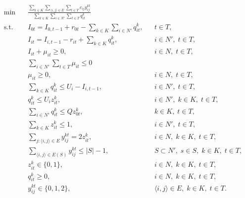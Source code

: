\documentclass{article}
\begin{document}
\begin{align}
    \min \quad & \frac{\displaystyle \sum_{k \in K} \sum_{\langle i,j\rangle \in E} \sum_{t \in T} c_{ij} y_{ij}^{kt}}
    {\displaystyle \sum_{k \in K} \sum_{i \in N'} \sum_{t \in T} q_{it}^k} \label{obj} \\
    \text{s.t.} \quad 
    & I_{0t} = I_{0,t-1} + r_{0t} - \sum_{k \in K} \sum_{i \in N'} q_{it}^k, && t \in T, \label{supbal} \\
    & I_{it} = I_{i,t-1} - r_{it} + \sum_{k \in K} q_{it}^k, && i \in N', \; t \in T, \label{custbal} \\
    & I_{it} + \mu_{it} \ge 0, && i \in N, \; t \in T, \label{no_stockout} \\    
    &\sum_{i\in N'}\sum_{t\in T} \mu_{it} \leq 0 \label{zero stockout} \\    
    & \mu_{it} \ge 0, && i \in N, \; t \in T, \label{nonneg_q} \\
    & \sum_{k \in K} q_{it}^k \le U_i - I_{i,t-1}, && i \in N', \; t \in T, \label{maxinv} \\
    & q_{it}^k \le U_i z_{it}^k, && i \in N', \; k \in K, \; t \in T, \label{link_qz} \\
    & \sum_{i \in N'} q_{it}^k \le Q z_{0t}^k, && k \in K, \; t \in T, \label{vehcap} \\
    & \sum_{k \in K} z_{it}^k \le 1, && i \in N', \; t \in T, \label{nosplit} \\
    & \sum_{j: \langle i,j \rangle \in E} y_{ij}^{kt} = 2 z_{it}^k, && i \in N, \; k \in K, \; t \in T, \label{routing1} \\
    & \sum_{\langle i,j \rangle \in E(S)} y_{ij}^{kt} \le |S| - 1, && S \subset N', \; s \in S, \; k \in K, \; t \in T, \label{subtour} \\
    & z_{it}^k \in \{0,1\}, && i \in N, \; k \in K, \; t \in T, \label{binary_z} \\
    & q_{it}^k \ge 0, && i \in N, \; k \in K, \; t \in T, \label{nonneg_q} \\
    & y_{ij}^{kt} \in \{0,1,2\}, && \langle i,j\rangle \in E, \; k \in K, \; t \in T. \label{domain_y}
\end{align}

 

\end{document}
